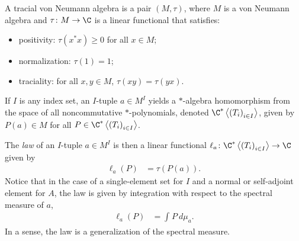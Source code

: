 \documentclass[10pt]{mypackage}
\begin{document}
A tracial von Neumann algebra is a pair $\left( M,\tau \right)$, where $M$ is a von Neumann algebra and $\tau\colon M\rightarrow \C$ is a linear functional that satisfies:
\begin{itemize}
  \item positivity: $\tau\left( x^{\ast}x \right) \geq 0$ for all $x\in M$;
  \item normalization: $\tau\left( 1 \right) = 1$;
  \item traciality: for all $x,y\in M$, $\tau\left( xy \right) = \tau\left( yx \right)$.
\end{itemize}
If $I$ is any index set, an $I$-tuple $a\in M^{I}$ yields a $\ast$-algebra homomorphism from the space of all noncommutative $\ast$-polynomials, denoted $ \C^{\ast}\left\langle \left( T_i \right)_{i\in I} \right\rangle $, given by $P(a)\in M$ for all $P\in \C^{\ast}\left\langle \left( T_i \right)_{i\in I} \right\rangle$.

The \textit{law} of an $I$-tuple $a\in M^{I}$ is then a linear functional $\ell_a\colon \C^{\ast}\left\langle \left( T_i \right)_{i\in I} \right\rangle\rightarrow \C$ given by
\begin{align*}
  \ell_a\left( P \right) &= \tau\left( P(a) \right).
\end{align*}
Notice that in the case of a single-element set for $I$ and a normal or self-adjoint element for $A$, the law is given by integration with respect to the spectral measure of $a$,
\begin{align*}
  \ell_a(P) &= \int_{}^{} P\:d\mu_a.
\end{align*}
In a sense, the law is a generalization of the spectral measure.
\end{document}
